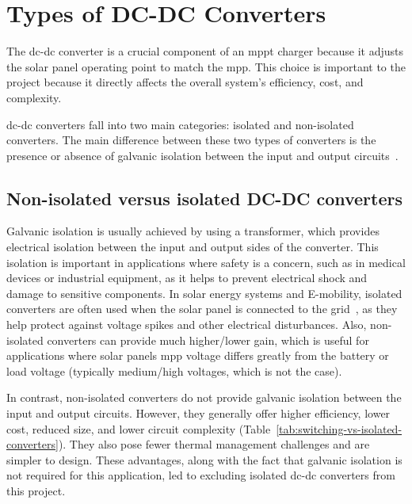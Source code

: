 \section{Types of DC-DC Converters}
    The \acs{dc}-\acs{dc} converter is a crucial component of an \acs{mppt} charger because it adjusts the solar panel operating point to match the \ac{mpp}. This choice is important to the project because it directly affects the overall system's efficiency, cost, and complexity.

    \acs{dc}-\acs{dc} converters fall into two main categories: isolated and non-isolated converters. The main difference between these two types of converters is the presence or absence of galvanic isolation between the input and output circuits~\cite{flexpower_isolated_vs_nonisolated_2025}.


    \subsection{Non-isolated versus isolated DC-DC converters}
        Galvanic isolation is usually achieved by using a transformer, which provides electrical isolation between the input and output sides of the converter. This isolation is important in applications where safety is a concern, such as in medical devices or industrial equipment, as it helps to prevent electrical shock and damage to sensitive components. In solar energy systems and E-mobility, isolated converters are often used when the solar panel is connected to the grid~\cite{Review_Isolated_Non_isolated_DC_DC_Converters_MVDC_2021}, as they help protect against voltage spikes and other electrical disturbances. Also, non-isolated converters can provide much higher/lower gain, which is useful for applications where 
        solar panels \ac{mpp} voltage differs greatly from the battery or load voltage (typically medium/high voltages, which is not the case). 

        In contrast, non-isolated converters do not provide galvanic isolation between the input and output circuits. However, they generally offer higher efficiency, lower cost, reduced size, and lower circuit complexity (Table~\ref{tab:switching-vs-isolated-converters}). They also pose fewer thermal management challenges and are simpler to design. These advantages, along with the fact that galvanic isolation is not required for this application, led to excluding isolated \acs{dc}-\acs{dc} converters from this project.

